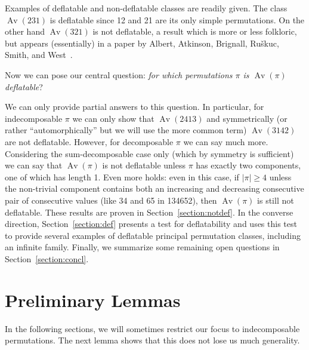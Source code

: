 \documentclass[10pt]{article}
\theoremstyle{plain}
\newcommand{\Av}{\operatorname{Av}}
\begin{document}
Examples of deflatable and non-deflatable classes are readily given.  The class $\Av(231)$ is deflatable since 12 and 21 are its only simple permutations.  On the other hand $\Av(321)$ is not deflatable, a result which is more or less folkloric, but appears (essentially) in a paper by Albert, Atkinson, Brignall, Ru\v{s}kuc, Smith, and West~\cite[Proposition 6]{albert:growth-rates-subclasses-321}.

Now we can pose our central question: 
\emph{for which permutations $\pi$ is $\Av(\pi)$ deflatable}?

We can only provide partial answers to this question. In particular, for indecomposable $\pi$ we can only show that $\Av(2413)$ and symmetrically (or rather ``automorphically'' but we will use the more common term) $\Av(3142)$ are not deflatable. However, for decomposable $\pi$ we can say much more. Considering the sum-decomposable case only (which by symmetry is sufficient) we can say that $\Av(\pi)$ is not deflatable unless $\pi$ has exactly two components, one of which has length 1. Even more holds: even in this case, if $|\pi| \geq 4$ unless the non-trivial component contains both an increasing and decreasing consecutive pair of consecutive values (like 34 and 65 in 134652), then $\Av(\pi)$ is still not deflatable. These results are proven in Section~\ref{section:notdef}. In the converse direction, Section~\ref{section:def} presents a test for deflatability and uses this test to provide several examples of deflatable principal permutation classes, including an infinite family. Finally, we summarize some remaining open questions in Section~\ref{section:concl}.

\section{Preliminary Lemmas}
\label{section:prelim-lemmas}

In the following sections, we will sometimes restrict our focus to indecomposable permutations. The next lemma shows that this does not lose us much generality.
\end{document}
